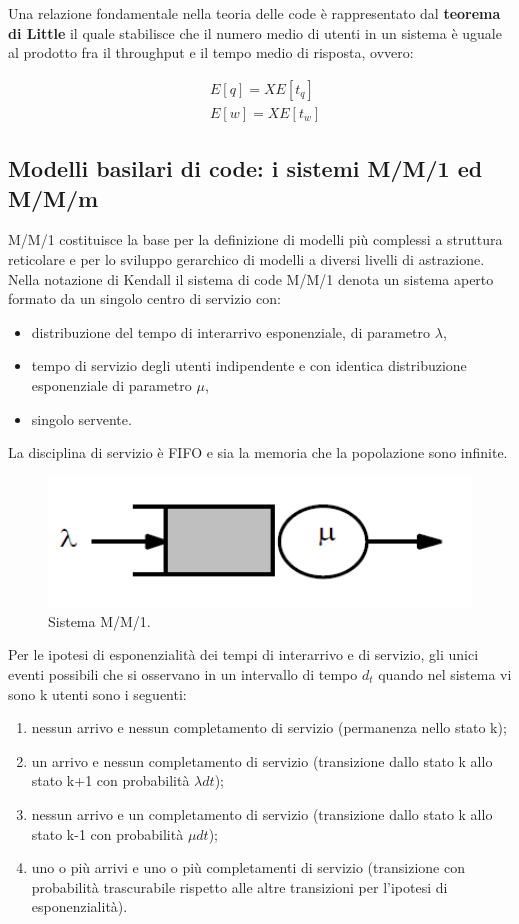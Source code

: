 Una relazione fondamentale nella teoria delle code è rappresentato dal \textbf{teorema di
Little} il quale stabilisce che il numero medio di utenti in un sistema è uguale al
prodotto fra il throughput e il tempo medio di risposta, ovvero:

\begin{align}
   & E[q] = X E[t_q] \\
   & E[w] = X E[t_w]
\end{align}

\subsection{Modelli basilari di code: i sistemi M/M/1 ed M/M/m}
M/M/1 costituisce la base per la definizione di modelli più
complessi a struttura reticolare e per lo sviluppo gerarchico di modelli a diversi livelli
di astrazione. Nella notazione di Kendall il sistema di code M/M/1 denota un sistema aperto
formato da un singolo centro di servizio con:
\begin{itemize}
    \item distribuzione del tempo di interarrivo esponenziale, di parametro $\lambda$,
    \item tempo di servizio degli utenti indipendente e con identica distribuzione
esponenziale di parametro $\mu$,
    \item singolo servente.
\end{itemize}
La disciplina di servizio è FIFO e sia la memoria che la popolazione sono infinite.
\begin{figure}[H]
	\centering
    \includegraphics[width=13cm, keepaspectratio]{img/sistema_mm1.png}
	\caption{Sistema M/M/1.}\label{fig:mm1}
\end{figure}

Per le ipotesi di esponenzialità dei tempi di interarrivo e di servizio, gli unici eventi possibili che si osservano in un intervallo di tempo $d_t$ quando nel sistema vi sono k utenti sono i seguenti:
\begin{enumerate}
    \item nessun arrivo e nessun completamento di servizio (permanenza nello stato k);
    \item un arrivo e nessun completamento di servizio (transizione dallo stato k allo stato k+1
con probabilità $\lambda dt$);
    \item nessun arrivo e un completamento di servizio (transizione dallo stato k allo stato k-1
con probabilità $\mu dt$);
    \item uno o più arrivi e uno o più completamenti di servizio (transizione con probabilità
trascurabile rispetto alle altre transizioni per l’ipotesi di esponenzialità).
\end{enumerate}

